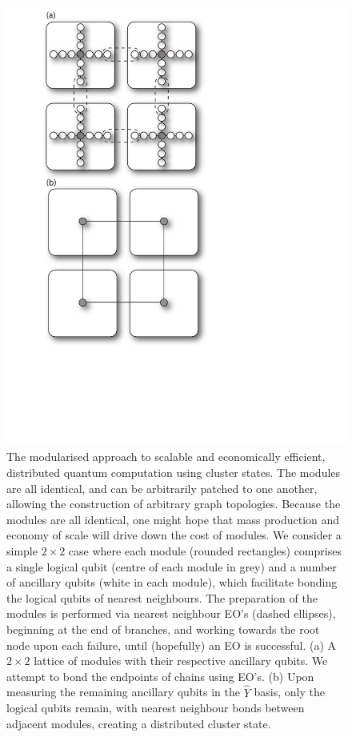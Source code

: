 \documentclass[aps,rmp,twocolumn,amsmath,amssymb,nofootinbib,superscriptaddress,longbibliography,floatfix]{revtex4-1}
\begin{document}
\begin{figure}[!htb]
\includegraphics[width=0.8\columnwidth]{module}
\caption{The modularised approach to scalable and economically efficient, distributed quantum computation using cluster states. The modules are all identical, and can be arbitrarily patched to one another, allowing the construction of arbitrary graph topologies. Because the modules are all identical, one might hope that mass production and economy of scale will drive down the cost of modules. We consider a simple \mbox{$2\times 2$} case where each module (rounded rectangles) comprises a single logical qubit (centre of each module in grey) and a number of ancillary qubits (white in each module), which facilitate bonding the logical qubits of nearest neighbours. The preparation of the modules is performed via nearest neighbour EO's (dashed ellipses), beginning at the end of branches, and working towards the root node upon each failure, until (hopefully) an EO is successful. (a) A \mbox{$2\times 2$} lattice of modules with their respective ancillary qubits. We attempt to bond the endpoints of chains using EO's. (b) Upon measuring the remaining ancillary qubits in the $\hat{Y}$ basis, only the logical qubits remain, with nearest neighbour bonds between adjacent modules, creating a distributed cluster state.} \label{fig:module}
\end{figure}
\end{document}
